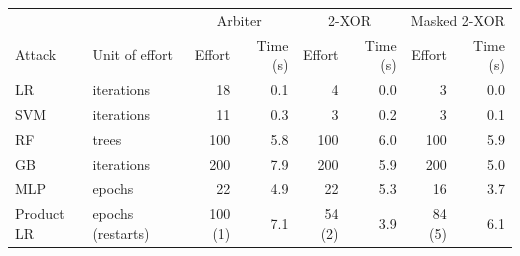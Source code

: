 \begin{tabular}{llrrrrrr}
\toprule
 & & \multicolumn{2}{c}{Arbiter} & \multicolumn{2}{c}{2-XOR} & \multicolumn{2}{c}{Masked 2-XOR} \\
Attack & Unit of effort & Effort & Time (s) & Effort & Time (s) & Effort & Time (s) \\
\midrule
LR & iterations & 18 & 0.1 & 4 & 0.0 & 3 & 0.0 \\
SVM & iterations & 11 & 0.3 & 3 & 0.2 & 3 & 0.1 \\
RF & trees & 100 & 5.8 & 100 & 6.0 & 100 & 5.9 \\
GB & iterations & 200 & 7.9 & 200 & 5.9 & 200 & 5.0 \\
MLP & epochs & 22 & 4.9 & 22 & 5.3 & 16 & 3.7 \\
Product LR & epochs (restarts) & 100 (1) & 7.1 & 54 (2) & 3.9 & 84 (5) & 6.1 \\
\bottomrule
\end{tabular}
